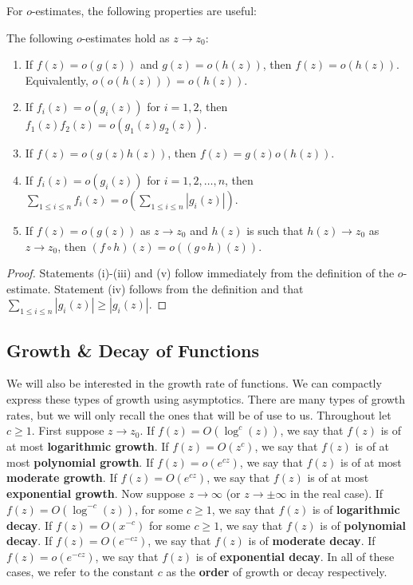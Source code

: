         For $o$-estimates, the following properties are useful:

        \begin{proposition}\label{prop:Little_Oh_manipulations}
            The following $o$-estimates hold as $z \to z_{0}$:
            \begin{enumerate}[label=(\roman*)]
              \item If $f(z) = o(g(z))$ and $g(z) = o(h(z))$, then $f(z) = o(h(z))$. Equivalently, $o(o(h(z))) = o(h(z))$.
              \item If $f_{i}(z) = o(g_{i}(z))$ for $i = 1,2$, then $f_{1}(z)f_{2}(z) = o(g_{1}(z)g_{2}(z))$.
              \item If $f(z) = o(g(z)h(z))$, then $f(z) = g(z)o(h(z))$.
              \item If $f_{i}(z) = o(g_{i}(z))$ for $i = 1,2,\ldots,n$, then $\sum_{1 \le i \le n}f_{i}(z) = o\left(\sum_{1 \le i \le n}|g_{i}(z)|\right)$.
              \item If $f(z) = o(g(z))$ as $z \to z_{0}$ and $h(z)$ is such that $h(z) \to z_{0}$ as $z \to z_{0}$, then $(f \circ h)(z) = o((g \circ h)(z))$.
            \end{enumerate}
        \end{proposition}
        \begin{proof}
          Statements (i)-(iii) and (v) follow immediately from the definition of the $o$-estimate. Statement (iv) follows from the definition and that $\sum_{1 \le i \le n}|g_{i}(z)| \ge |g_{i}(z)|$.
        \end{proof}
      \subsection*{Growth \& Decay of Functions}
        We will also be interested in the growth rate of functions. We can compactly express these types of growth using asymptotics. There are many types of growth rates, but we will only recall the ones that will be of use to us. Throughout let $c \ge 1$. First suppose $z \to z_{0}$. If $f(z) = O(\log^{c}(z))$, we say that $f(z)$ is of at most \textbf{logarithmic growth}. If $f(z) = O(z^{c})$, we say that $f(z)$ is of at most \textbf{polynomial growth}. If $f(z) = o(e^{cz})$, we say that $f(z)$ is of at most \textbf{moderate growth}. If $f(z) = O(e^{cz})$, we say that $f(z)$ is of at most \textbf{exponential growth}. Now suppose $z \to \infty$ (or $z \to \pm\infty$ in the real case). If $f(z) = O(\log^{-c}(z))$, for some $c \ge 1$, we say that $f(z)$ is of \textbf{logarithmic decay}. If $f(z) = O(x^{-c})$ for some $c \ge 1$, we say that $f(z)$ is of \textbf{polynomial decay}. If $f(z) = O(e^{-cz})$, we say that $f(z)$ is of \textbf{moderate decay}. If $f(z) = o(e^{-cz})$, we say that $f(z)$ is of \textbf{exponential decay}. In all of these cases, we refer to the constant $c$ as the \textbf{order} of growth or decay respectively.
